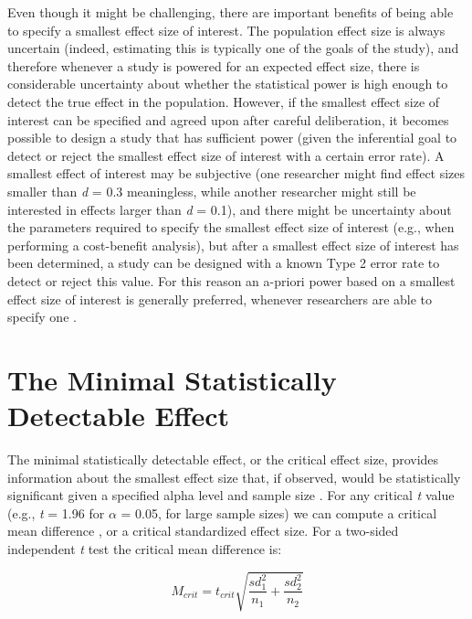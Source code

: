 \documentclass[
]{krantz}
\begin{document}
Even though it might be challenging, there are important benefits of being able to specify a smallest effect size of interest. The population effect size is always uncertain (indeed, estimating this is typically one of the goals of the study), and therefore whenever a study is powered for an expected effect size, there is considerable uncertainty about whether the statistical power is high enough to detect the true effect in the population. However, if the smallest effect size of interest can be specified and agreed upon after careful deliberation, it becomes possible to design a study that has sufficient power (given the inferential goal to detect or reject the smallest effect size of interest with a certain error rate). A smallest effect of interest may be subjective (one researcher might find effect sizes smaller than \emph{d} = 0.3 meaningless, while another researcher might still be interested in effects larger than \emph{d} = 0.1), and there might be uncertainty about the parameters required to specify the smallest effect size of interest (e.g., when performing a cost-benefit analysis), but after a smallest effect size of interest has been determined, a study can be designed with a known Type 2 error rate to detect or reject this value. For this reason an a-priori power based on a smallest effect size of interest is generally preferred, whenever researchers are able to specify one \citep{brown_errors_1983, aberson_applied_2019, albers_when_2018, cascio_open_1983, dienes_using_2014, lenth_practical_2001}.

\hypertarget{the-minimal-statistically-detectable-effect}{%
\section{The Minimal Statistically Detectable Effect}\label{the-minimal-statistically-detectable-effect}}

The minimal statistically detectable effect, or the critical effect size, provides information about the smallest effect size that, if observed, would be statistically significant given a specified alpha level and sample size \citep{cook_assessing_2014}. For any critical \emph{t} value (e.g., \emph{t} = 1.96 for \(\alpha\) = 0.05, for large sample sizes) we can compute a critical mean difference \citep{phillips_statistical_2001}, or a critical standardized effect size. For a two-sided independent \emph{t} test the critical mean difference is:

\[M_{crit} = t_{crit}{\sqrt{\frac{sd_1^2}{n_1} + \frac{sd_2^2}{n_2}}}\]
\end{document}
